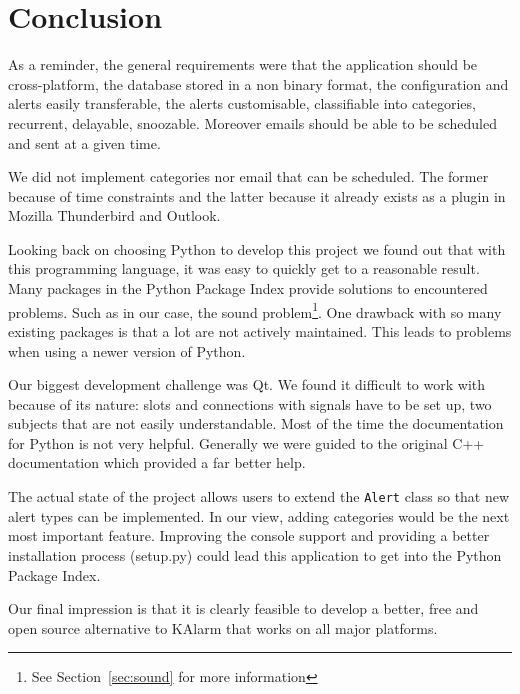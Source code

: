 \chapter{Conclusion}

As a reminder, the general requirements were that the application should be
cross-platform, the database stored in a non binary format, the configuration
and alerts easily transferable, the alerts customisable, classifiable into
categories, recurrent, delayable, snoozable. Moreover emails should be able to
be scheduled and sent at a given time.

We did not implement categories nor email that can be scheduled. The former
because of time constraints and the latter because it already exists as a plugin
in Mozilla Thunderbird and Outlook.

Looking back on choosing Python to develop this project we found out that with
this programming language, it was easy to quickly get to a reasonable result.
Many packages in the Python Package Index provide solutions to encountered
problems. Such as in our case, the sound problem\footnote{See
Section~\ref{sec:sound} for more information}. One drawback with so many
existing packages is that a lot are not actively maintained. This leads to
problems when using a newer version of Python.

Our biggest development challenge was Qt. We found it difficult to work with
because of its nature: slots and connections with signals have to be set up, two
subjects that are not easily understandable. Most of the time the documentation
for Python is not very helpful. Generally we were guided to the original C++
documentation which provided a far better help.

The actual state of the project allows users to extend the \texttt{Alert} class
so that new alert types can be implemented. In our view, adding categories would
be the next most important feature. Improving the console support and
providing a better installation process (setup.py) could lead this application
to get into the Python Package Index.

Our final impression is that it is clearly feasible to develop a better, free
and open source alternative to KAlarm that works on all major platforms.
